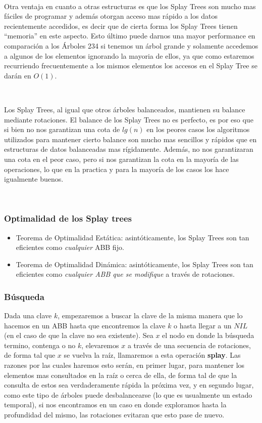 ~

Otra ventaja en cuanto a otras estructuras es que los Splay Trees son mucho mas f\'aciles de programar y adem\'as otorgan acceso mas r\'apido a los datos recientemente accedidos, es decir que de cierta forma los Splay Trees tienen ``memoria'' en este aspecto. Esto \'ultimo puede darnos una mayor performance en comparaci\'on a los \'Arboles 234 si tenemos un \'arbol grande y solamente accedemos a algunos de los elementos ignorando la mayoria de ellos, ya que como estaremos recurriendo frecuentemente a los mismos elementos los accesos en el Splay Tree se dar\'an en $O(1)$.

~

Los Splay Trees, al igual que otros \'arboles balanceados, mantienen su balance mediante rotaciones. El balance de los Splay Trees no es perfecto, es por eso que si bien no nos garantizan una cota de $lg(n)$ en los peores casos los algoritmos utilizados para mantener cierto balance son mucho mas sencillos y r\'apidos que en estructuras de datos balanceadas mas r\'igidamente. Adem\'as, no nos garantizaran una cota en el peor caso, pero si nos garantizan la cota en la mayor\'ia de las operaciones, lo que en la practica y para la mayor\'ia de los casos los hace igualmente buenos.

~

\subsubsection{Optimalidad de los Splay trees}
\begin{itemize}
 \item Teorema de Optimalidad Est\'atica: asint\'oticamente, los Splay Trees son tan eficientes como \textit{cualquier} ABB fijo.
 \item Teorema de Optimalidad Din\'amica: asint\'oticamente, los Splay Trees son tan eficientes como \textit{cualquier ABB que se modifique} a trav\'es de rotaciones.
\end{itemize}


\subsubsection{B\'usqueda}

Dada una clave $k$, empezaremos a buscar la clave de la misma manera que lo hacemos en un ABB hasta que encontremos la clave $k$ o hasta llegar a un $NIL$ (en el caso de que la clave no sea existente). Sea $x$ el nodo en donde la b\'usqueda termino, contenga o no $k$, elevaremos $x$ a trav\'es de una secuencia de rotaciones, de forma tal que $x$ se vuelva la ra\'iz, llamaremos a esta operaci\'on \textbf{splay}. Las razones por las cuales haremos esto ser\'an, en primer lugar, para mantener los elementos mas consultados en la ra\'iz o cerca de ella, de forma tal de que la consulta de estos sea verdaderamente r\'apida la pr\'oxima vez, y en segundo lugar, como este tipo de \'arboles puede desbalancearse (lo que es usualmente un estado temporal), si nos encontramos en un caso en donde exploramos hasta la profundidad del mismo, las rotaciones evitaran que esto pase de nuevo.

